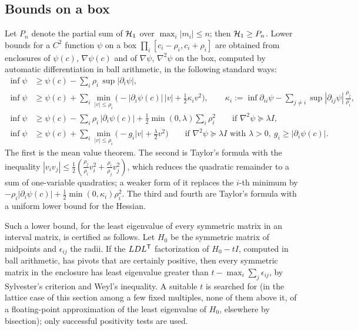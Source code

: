 \subsection{Bounds on a box}\label{ssec:taylor}

Let $P_n$ denote the partial sum of $\mathcal H_1$ over $\max_i|m_i|\le n$; then $\mathcal H_1\ge P_n$. Lower bounds for a $C^2$ function $\psi$ on a
box $\prod_i[c_i-\rho_i,c_i+\rho_i]$ are obtained from enclosures of $\psi(c)$, $\nabla\psi(c)$ and of $\nabla\psi$, $\nabla^2\psi$ on the
box, computed by automatic differentiation in ball arithmetic, in the following standard ways:
\begin{align}
  \inf\psi&\ge\psi(c)-\sum_i\rho_i\,\sup|\partial_i\psi|,\label{eq:T4}\\
  \inf\psi&\ge\psi(c)+\sum_i\min_{|v|\le\rho_i}\bigl(-|\partial_i\psi(c)|\,|v|+\tfrac12\kappa_iv^2\bigr),\qquad
      \kappa_i:=\inf\partial_{ii}\psi-\sum_{j\ne i}\sup|\partial_{ij}\psi|\,\frac{\rho_j}{\rho_i},\label{eq:T1}\\
  \inf\psi&\ge\psi(c)-\sum_i\rho_i\,|\partial_i\psi(c)|+\tfrac12\min(0,\lambda)\sum_i\rho_i^2\qquad\text{if }\nabla^2\psi\succeq\lambda I,\label{eq:T2}\\
  \inf\psi&\ge\psi(c)+\sum_i\min_{|v|\le\rho_i}\bigl(-g_i|v|+\tfrac\lambda2v^2\bigr)\qquad\text{if }\nabla^2\psi\succeq\lambda I\text{ with }\lambda>0,\ g_i\ge|\partial_i\psi(c)|.\label{eq:T5}
\end{align}
The first is the mean value theorem. The second is Taylor's formula with the inequality
$|v_iv_j|\le\frac12(\frac{\rho_j}{\rho_i}v_i^2+\frac{\rho_i}{\rho_j}v_j^2)$, which reduces the quadratic remainder to a sum of
one-variable quadratics; a weaker form of it replaces the $i$-th minimum by $-\rho_i|\partial_i\psi(c)|+\frac12\min(0,\kappa_i)\rho_i^2$.
The third and fourth are Taylor's formula with a uniform lower bound for the Hessian.

Such a lower bound, for the least eigenvalue of every symmetric matrix in an interval matrix, is certified as follows. Let $H_0$
be the symmetric matrix of midpoints and $\epsilon_{ij}$ the radii. If the $LDL^\mathsf T$ factorization of $H_0-tI$, computed in ball
arithmetic, has pivots that are certainly positive, then every symmetric matrix in the enclosure has least eigenvalue greater than
$t-\max_i\sum_j\epsilon_{ij}$, by Sylvester's criterion and Weyl's inequality. A suitable $t$ is searched for (in the lattice case
of this section among a few fixed multiples, none of them above it, of a floating-point approximation of the least eigenvalue of
$H_0$, elsewhere by bisection); only successful positivity tests are used.

